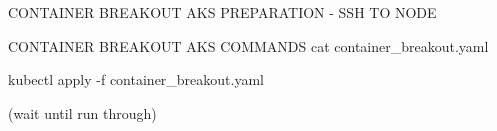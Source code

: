 \fi
CONTAINER BREAKOUT AKS PREPARATION - SSH TO NODE

CONTAINER BREAKOUT AKS COMMANDS
\iffalse
cat container_breakout.yaml

kubectl apply -f container_breakout.yaml

(wait until run through)

